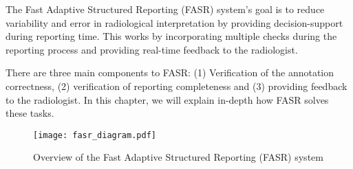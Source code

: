 The Fast Adaptive Structured Reporting (FASR) system's goal is to reduce variability and error in radiological interpretation by providing decision-support during reporting time. This works by incorporating multiple checks during the reporting process and providing real-time feedback to the radiologist.

There are three main components to FASR: (1) Verification of the annotation correctness, (2) verification of reporting completeness and (3) providing feedback to the radiologist. In this chapter, we will explain in-depth how FASR solves these tasks.

\begin{figure}[h]
\centering
\texttt{[image: fasr\_diagram.pdf]}
\caption{Overview of the Fast Adaptive Structured Reporting (FASR) system}
\label{fig:fasr_diagram}
\end{figure}